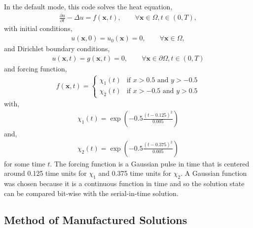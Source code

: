 \documentclass{article}
\begin{document}
In the default mode, this code solves the heat equation,
\begin{align}
  \frac{\partial u}{\partial t} - \Delta u = f(\boldsymbol{x},t), \qquad \forall\boldsymbol{x}\in\Omega,t\in\left(
  0,T \right),
\end{align}
with initial conditions,
\begin{align}
  u(\boldsymbol{x},0) = u_0(\boldsymbol{x}) = 0, \qquad \forall \boldsymbol{x}\in\Omega,
\end{align}
and Dirichlet boundary conditions,
\begin{align}
  u(\boldsymbol{x},t) = g(\boldsymbol{x},t) = 0, \qquad \forall \boldsymbol{x}\in\partial\Omega,t\in\left( 0,T \right)
\end{align}
and forcing function,
\begin{align}
  f(\mathbf x, t) = \left\{
  \begin{array}{ll}
    \chi_1(t) & \text{if  \(x>0.5\) and \(y>-0.5\)} \\
    \chi_2(t) & \text{if \(x>-0.5\) and \(y>0.5\)}
  \end{array}
  \right.
\end{align}
with,
\begin{align}
  \chi_1(t) = \exp\left(-0.5\frac{(t-0.125)^2}{0.005}\right)
\end{align}
and,
\begin{align}
  \chi_2(t) = \exp\left(-0.5\frac{(t-0.375)^2}{0.005}\right)
\end{align}
for some time \(t\).
The forcing function is a Gaussian pulse in time that is centered around 0.125 time units for \(\chi_1\) and 0.375 time units for \(\chi_2\).
A Gaussian function was chosen because it is a continuous function in time and so the solution state can be compared bit-wise with the serial-in-time solution.

\subsection{Method of Manufactured Solutions}
\end{document}
